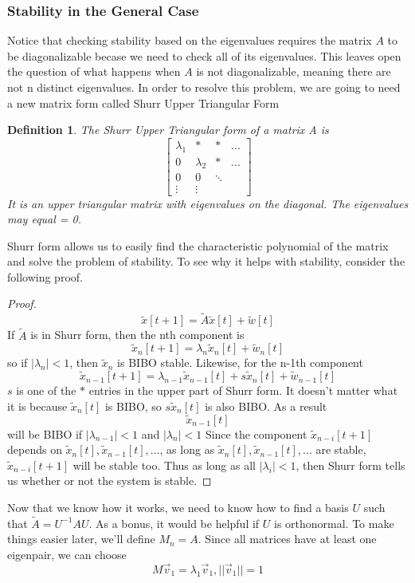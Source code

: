\documentclass{article}
\newtheorem{definition}{Definition}
\newtheorem{proof}{Proof}
\begin{document}
\subsubsection{Stability in the General Case}
Notice that checking stability based on the eigenvalues requires the matrix $A$ to be diagonalizable becase we need to check all of its eigenvalues.
This leaves open the question of what happens when $A$ is not diagonalizable, meaning there are not n distinct eigenvalues.
In order to resolve this problem, we are going to need a new matrix form called Shurr Upper Triangular Form
\begin{definition}
    The Shurr Upper Triangular form of a matrix A is
    \[
        \left[
            \begin{array}{cccc}
                \lambda_1 & * & * & ... \\
                0 & \lambda_2 & * & ... \\
                0 & 0 & \ddots & \\
                \vdots & \vdots &  & 
            \end{array}
        \right]
        \]
    It is an upper triangular matrix with eigenvalues on the diagonal. The eigenvalues may equal = 0.
\end{definition}
Shurr form allows us to easily find the characteristic polynomial of the matrix and solve the problem of stability.
To see why it helps with stability, consider the following proof.
\begin{proof}
    $$\tilde{x}[t+1]=\tilde{A}\tilde{x}[t]+\tilde{w}[t]$$
    If $\tilde{A}$ is in Shurr form, then the nth component is
    $$\tilde{x}_n[t+1]=\lambda_n\tilde{x}_n[t]+\tilde{w}_n[t]$$
    so if $|\lambda_n| < 1$, then $\tilde{x}_n$ is BIBO stable.
    Likewise, for the n-1th component
    $$\tilde{x}_{n-1}[t+1]=\lambda_{n-1}\tilde{x}_{n-1}[t]+s\tilde{x}_n[t]+\tilde{w}_{n-1}[t]$$
    $s$ is one of the $*$ entries in the upper part of Shurr form. It doesn't matter what it is because $\tilde{x}_n[t]$ is BIBO, so $s\tilde{x}_n[t]$ is also BIBO.
    As a result $$\tilde{x}_{n-1}[t]$$ will be BIBO if $|\lambda_{n-1}|<1$ and $|\lambda_n| < 1$
    Since the component $\tilde{x}_{n-i}[t+1]$ depends on $\tilde{x}_n[t], \tilde{x}_{n-1}[t],...$, as long as $\tilde{x}_n[t], \tilde{x}_{n-1}[t],...$ are stable, $\tilde{x}_{n-i}[t+1]$ will be stable too.
    Thus as long as all $|\lambda_i|<1$, then Shurr form tells us whether or not the system is stable.
\end{proof}
Now that we know how it works, we need to know how to find a basis $U$ such that $\tilde{A}=U^{-1}AU$. As a bonus, it would be helpful if $U$ is orthonormal.
To make things easier later, we'll define $M_n = A$. Since all matrices have at least one eigenpair, we can choose
$$M\vec{v}_1=\lambda_1\vec{v}_1, ||\vec{v}_1||=1$$
\end{document}
